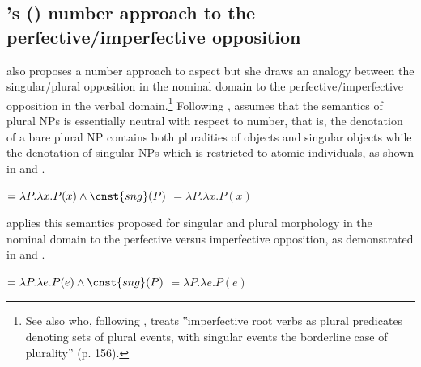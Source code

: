 \documentclass[output=paper]{langscibook}
\begin{document}
\subsection{\citeauthor{Kagan2008}'s (\citeyear{Kagan2008, Kagan2010}) number approach to the perfective/imperfective opposition}\label{jan-bla:fansb:kb:sec4.2}

\citet{Kagan2008, Kagan2010} also proposes a number approach to aspect but she draws an analogy between the singular/plural opposition in the nominal domain to the perfective/imperfective opposition in the verbal domain.\footnote{See also \citet{Rothstein2020} who, following \citet{Kagan2010}, treats ‟imperfective root verbs as plural predicates denoting sets of plural events, with singular events the borderline case of plurality” (p. 156).} Following \citet{Sauerland2003a}, \citet{Kagan2008, Kagan2010} assumes that the semantics of plural NPs is essentially neutral with respect to number, that is, the denotation of a bare plural NP contains both pluralities of objects and singular objects while the denotation of singular NPs which is restricted to atomic individuals, as shown in  and .

\ea {} $= \lambda P. \lambda x.P(x) \wedge \cnst{sng}(P) $\label{jan-bla:fansb:kb:ex13}
\ex{} $= \lambda P. \lambda x.P(x) $\label{jan-bla:fansb:kb:ex14}
\z 

\noindent \citet{Kagan2008, Kagan2010} applies this semantics proposed for singular and plural morphology in the nominal domain to the perfective versus imperfective opposition, as demonstrated in  and . 

\ea {} $= \lambda P. \lambda e.P(e) \wedge \cnst{sng}(P) $\label{jan-bla:fansb:kb:ex15}
\ex {} $= \lambda P. \lambda e.P(e) $\label{jan-bla:fansb:kb:ex16}
\z 
\end{document}
